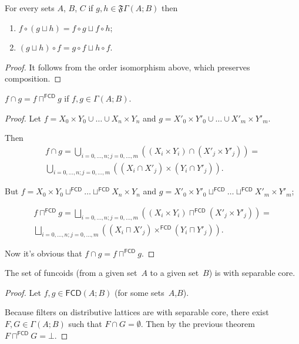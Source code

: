 \begin{thm}
For every sets $A$, $B$, $C$ if $g,h\in\mathfrak{F}\Gamma(A;B)$
then
\begin{enumerate}
\item $f\circ(g\sqcup h)=f\circ g\sqcup f\circ h$;
\item $(g\sqcup h)\circ f=g\circ f\sqcup h\circ f$.
\end{enumerate}
\end{thm}
\begin{proof}
It follows from the order isomorphism above, which preserves composition.\end{proof}
\begin{thm}
$f\cap g=f\sqcap^{\mathsf{FCD}}g$ if $f,g\in\Gamma(A;B)$.\end{thm}
\begin{proof}
Let $f=X_{0}\times Y_{0}\cup\ldots\cup X_{n}\times Y_{n}$ and $g=X'_{0}\times Y'_{0}\cup\ldots\cup X'_{m}\times Y'_{m}$.

Then 
\begin{multline*}
f\cap g=\bigcup_{i=0,\ldots,n;j=0,\ldots,m}((X_{i}\times Y_{i})\cap(X'_{j}\times Y'_{j}))=\\
\bigcup_{i=0,\ldots,n;j=0,\ldots,m}((X_{i}\cap X'_{j})\times(Y_{i}\cap Y'_{j})).
\end{multline*}


But $f=X_{0}\times Y_{0}\sqcup^{\mathsf{FCD}}\ldots\sqcup^{\mathsf{FCD}}X_{n}\times Y_{n}$
and $g=X'_{0}\times Y'_{0}\sqcup^{\mathsf{FCD}}\ldots\sqcup^{\mathsf{FCD}}X'_{m}\times Y'_{m}$;

\begin{multline*}
f\sqcap^{\mathsf{FCD}}g=\bigsqcup_{i=0,\ldots,n;j=0,\ldots,m}((X_{i}\times Y_{i})\sqcap^{\mathsf{FCD}}(X'_{j}\times Y'_{j}))=\\
\bigsqcup_{i=0,\ldots,n;j=0,\ldots,m}((X_{i}\sqcap X'_{j})\times^{\mathsf{FCD}}(Y_{i}\sqcap Y'_{j})).
\end{multline*}


Now it's obvious that $f\cap g=f\sqcap^{\mathsf{FCD}}g$.\end{proof}
\begin{thm}
The set of funcoids (from a given set~$A$ to a given set~$B$)
is with separable core.\end{thm}
\begin{proof}
Let $f,g\in\mathsf{FCD}(A;B)$ (for some sets~$A$,$B$).

Because filters on distributive lattices are with separable core,
there exist $F,G\in\Gamma(A;B)$ such that $F\cap G=\emptyset$. Then
by the previous theorem $F\sqcap^{\mathsf{FCD}}G=\bot$.\end{proof}
